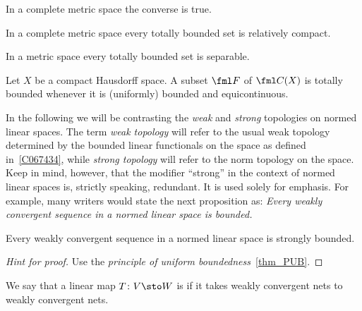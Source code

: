 In a complete metric space the converse is true.

\begin{prop} In a complete metric space every totally bounded set is relatively compact.
\end{prop}

\begin{prop} In a metric space every totally bounded set is separable.
\end{prop}

\begin{thm}\label{AAThm} Let $X$ be a compact Hausdorff space. A subset $\fml F$
of $\fml C(X)$ is totally bounded whenever it is (uniformly) bounded and equicontinuous.
\end{thm}

In the following we will be contrasting the \emph{weak} and \emph{strong} topologies on normed linear spaces.
The term
\emph{weak topology} will refer to the usual weak topology determined by the bounded linear functionals
on the space as defined in~\ref{C067434}, while \emph{strong topology} will refer to the norm topology on the space.
Keep in mind, however, that the modifier ``strong'' in the context of normed linear spaces is, strictly speaking, 
redundant.  It is used solely for emphasis.  For example, many writers would state the next proposition as: 
\emph{Every weakly convergent sequence in a normed linear space is bounded.}

\begin{prop} Every weakly convergent sequence in a normed linear space is strongly bounded.
\end{prop}

\begin{proof}[\emph{Hint for proof}] Use the \emph{principle of uniform boundedness}~\ref{thm_PUB}. \ns
\end{proof}

\begin{defn} We say that a linear map $T\colon V \sto W$ is
 if it takes weakly convergent nets to weakly convergent nets.
\end{defn}

